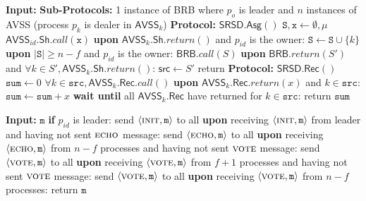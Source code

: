 \begin{algorithm}
    \label{alg:SRSD}
    \caption{Implementation of \textsf{SRSD} for process $p_{id}$ adapted from
    \cite{Freitas2022Distributed}}
    \begin{algorithmic}
        \State \textbf{Input:}
        \State \textbf{Sub-Protocols:} 1 instance of \textsf{BRB} where $p_o$ is leader and $n$
        instances of \textsf{AVSS} (process $p_k$ is dealer in $\textsf{AVSS}_k$)
        \medskip
        \State \textbf{Protocol:} $\textsf{SRSD}.\textsf{Asg}()$
        \State $\texttt{S}, \texttt{x} \gets \emptyset, \mu$
        \State $\textsf{AVSS}_{id}.\textsf{Sh}.call(\texttt{x})$
        \State \textbf{upon} $\textsf{AVSS}_k.\textsf{Sh}.return()$ and $p_{id}$ is the owner:
        \State \quad $\texttt{S} \gets \texttt{S} \cup \{k\}$
        \State \textbf{upon} $|\texttt{S}| \ge n-f$ and $p_{id}$ is the owner:
        \State \quad $\textsf{BRB}.call(S)$
        \State \textbf{upon} $\textsf{BRB}.return(S')$ and
        $\forall k \in S', \textsf{AVSS}_k.\textsf{Sh}.return()$:
        \State \quad $\textsf{src} \gets S'$
        \State \quad return
        \medskip
        \State \textbf{Protocol:} $\textsf{SRSD}.\textsf{Rec}()$
        \State $\texttt{sum} \gets 0$
        \State $\forall k \in \texttt{src}, \textsf{AVSS}_k.\textsf{Rec}.call()$
        \State \textbf{upon} $\textsf{AVSS}_k.\textsf{Rec}.return(x)$ and $k \in \texttt{src}$:
        \State \quad $\texttt{sum} \gets \texttt{sum} + x$
        \State \textbf{wait until} all $\textsf{AVSS}_k.\textsf{Rec}$ have returned for
        $k \in \texttt{src}$:
        \State \quad return $\texttt{sum}$
    \end{algorithmic}
\end{algorithm}

\begin{algorithm}
    \label{alg:BRB}
    \caption{Implementation of \textsf{BRB} for process $p_{id}$ from \cite{Bracha1987Asynchronous}}
    \begin{algorithmic}
        \State \textbf{Input:} $\texttt{m}$
        \medskip
        \State \textbf{if} $p_{id}$ is leader:
        \State \quad send $\langle \textsc{init}, \texttt{m} \rangle$ to all
        \State \textbf{upon} receiving $\langle \textsc{init}, \texttt{m} \rangle$ from leader and
        having not sent $\textsc{echo}$ message:
        \State \quad send $\langle \textsc{echo}, \texttt{m} \rangle$ to all
        \State \textbf{upon} receiving $\langle \textsc{echo}, \texttt{m} \rangle$ from $n-f$
        processes and having not sent $\textsc{vote}$ message:
        \State \quad send $\langle \textsc{vote}, \texttt{m} \rangle$ to all
        \State \textbf{upon} receiving $\langle \textsc{vote}, \texttt{m} \rangle$ from $f+1$
        processes and having not sent $\textsc{vote}$ message:
        \State \quad send $\langle \textsc{vote}, \texttt{m} \rangle$ to all
        \State \textbf{upon} receiving $\langle \textsc{vote}, \texttt{m} \rangle$ from $n-f$
        processes:
        \State \quad return $\texttt{m}$
    \end{algorithmic}
\end{algorithm}
